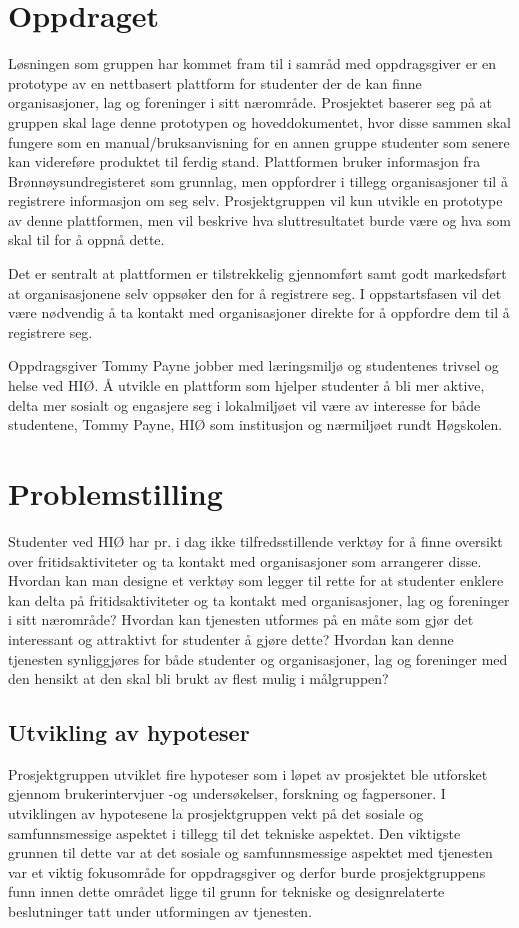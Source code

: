 \section{Oppdraget}
Løsningen som gruppen har kommet fram til i samråd med oppdragsgiver er en prototype av en nettbasert plattform for studenter der de kan finne organisasjoner, lag og foreninger i sitt nærområde. Prosjektet baserer seg på at gruppen skal lage denne prototypen og hoveddokumentet, hvor disse sammen skal fungere som en manual/bruksanvisning for en annen gruppe studenter som senere kan videreføre produktet til ferdig stand.  Plattformen bruker informasjon fra Brønnøysundregisteret som grunnlag, men oppfordrer i tillegg organisasjoner til å registrere informasjon om seg selv. Prosjektgruppen vil kun utvikle en prototype av denne plattformen, men vil beskrive hva sluttresultatet burde være og hva som skal til for å oppnå dette. 

Det er sentralt at plattformen er tilstrekkelig gjennomført samt godt markedsført at organisasjonene selv oppsøker den for å registrere seg. I oppstartsfasen vil det være nødvendig å ta kontakt med organisasjoner direkte for å oppfordre dem til å registrere seg.

Oppdragsgiver Tommy Payne jobber med læringsmiljø og studentenes trivsel og helse ved HIØ. Å utvikle en plattform som hjelper studenter å bli mer aktive, delta mer sosialt og engasjere seg i lokalmiljøet vil være av interesse for både studentene, Tommy Payne, HIØ som institusjon og nærmiljøet rundt Høgskolen.

\section{Problemstilling}
Studenter ved HIØ har pr. i dag ikke tilfredsstillende verktøy for å finne oversikt over fritidsaktiviteter og ta kontakt med organisasjoner som arrangerer disse. Hvordan kan man designe et verktøy som legger til rette for at studenter enklere kan delta på fritidsaktiviteter og ta kontakt med organisasjoner, lag og foreninger i sitt nærområde? Hvordan kan tjenesten utformes på en måte som gjør det interessant og attraktivt for studenter å gjøre dette? Hvordan kan denne tjenesten synliggjøres for både studenter og organisasjoner, lag og foreninger med den hensikt at den skal bli brukt av flest mulig i målgruppen?

\subsection{Utvikling av hypoteser}
\label{section:hypoteser}
Prosjektgruppen utviklet fire hypoteser som i løpet av prosjektet ble utforsket gjennom brukerintervjuer -og undersøkelser, forskning og fagpersoner. I utviklingen av hypotesene la prosjektgruppen vekt på det sosiale og samfunnsmessige aspektet i tillegg til det tekniske aspektet. Den viktigste grunnen til dette var at det sosiale og samfunnsmessige aspektet med tjenesten var et viktig fokusområde for oppdragsgiver og derfor burde prosjektgruppens funn innen dette området ligge til grunn for tekniske og designrelaterte beslutninger tatt under utformingen av tjenesten.

